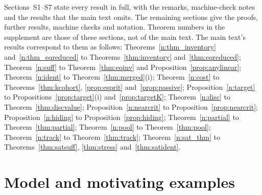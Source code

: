 \documentclass[12pt]{article}
\theoremstyle{definition}
\theoremstyle{remark}
\begin{document}
\noindent Sections~S1--S7 state every result in full, with the remarks, machine-check notes and the results that the main text omits. The remaining sections give the proofs, further results, machine checks and notation. Theorem numbers in the supplement are those of these sections, not of the main text. The main text's results correspond to them as follows: Theorems~\ref{n:thm_inventory} and~\ref{n:thm_eqreduced} to Theorems~\ref{thm:inventory} and~\ref{thm:eqreduced}; Theorem~\ref{n:suff} to Theorem~\ref{thm:eqinv} and Proposition~\ref{prop:anylinear}; Theorem~\ref{n:ident} to Theorem~\ref{thm:merged}(i); Theorem~\ref{n:cost} to Theorems~\ref{thm:kcohort}, \ref{prop:esprit} and~\ref{prop:passive}; Proposition~\ref{n:target} to Propositions~\ref{prop:target}(i) and~\ref{prop:targetK}; Theorem~\ref{n:disc} to Theorem~\ref{thm:discvalue}; Proposition~\ref{n:nearcrit} to Proposition~\ref{prop:nearcrit}; Proposition~\ref{n:hiding} to Proposition~\ref{prop:hiding}; Theorem~\ref{n:partial} to Theorem~\ref{thm:partial}; Theorem~\ref{n:pool} to Theorem~\ref{thm:pool}; Theorem~\ref{n:track} to Theorem~\ref{thm:track}; Theorem~\ref{n:sat_thm} to Theorems~\ref{thm:satsuff}, \ref{thm:stress} and~\ref{thm:satident}.

\section{Model and motivating examples}\label{sec:model}
\end{document}
